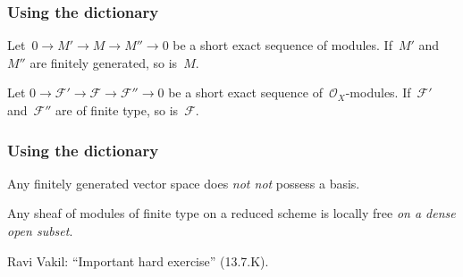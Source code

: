 \documentclass[12pt,utf8,notheorems,compress,t]{beamer}
\newcommand{\F}{\mathcal{F}}
\renewcommand{\O}{\mathcal{O}}
\renewcommand{\_}{\mathpunct{.}}
\newcommand{\?}{\,{:}\,}
\begin{document}
\begin{frame}\frametitle{Using the dictionary}
  \begin{center}
    \begin{minipage}{0.75\textwidth}
      \begin{exampleblock}{}
        \justifying
        Let~$0 \to M' \to M \to M'' \to 0$ be a short exact sequence of
        modules. If~$M'$ and~$M''$ are finitely generated, so is~$M$.
      \end{exampleblock}
    \end{minipage}
    \medskip

    \scalebox{3}{$\Downarrow$}

    \begin{minipage}{0.75\textwidth}
      \begin{exampleblock}{}
        \justifying
        Let $0 \to \F' \to \F \to \F'' \to 0$ be a short exact sequence
        of~$\O_X$-modules. If~$\F'$ and~$\F''$ are of finite type, so
        is~$\F$.
      \end{exampleblock}
    \end{minipage}
  \end{center}
\end{frame}

\begin{frame}[c]\frametitle{Using the dictionary}
  \begin{center}
    \begin{minipage}{0.70\textwidth}
      \begin{exampleblock}{}
        \justifying
        Any finitely generated vector space does \emph{not not} possess a basis.
      \end{exampleblock}
    \end{minipage}
    \medskip

    \scalebox{3}{$\Downarrow$}

    \begin{minipage}{0.70\textwidth}
      \begin{exampleblock}{}
        \justifying
        Any sheaf of modules of finite type on a reduced scheme is locally free
        \emph{on a dense open subset}.
      \end{exampleblock}
      \centering
      \tiny Ravi Vakil: ``Important hard exercise'' (13.7.K).
      \par
    \end{minipage}
  \end{center}
\end{frame}
\end{document}
